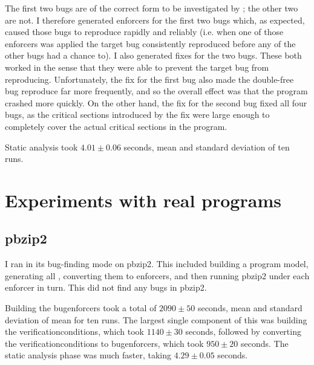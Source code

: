 
The first two bugs are of the correct form to be investigated by
{\technique}; the other two are not.  I therefore generated enforcers
for the first two bugs which, as expected, caused those bugs to
reproduce rapidly and reliably (i.e. when one of those enforcers was
applied the target bug consistently reproduced before any of the other
bugs had a chance to).  I also generated fixes for the two bugs.
These both worked in the sense that they were able to prevent the
target bug from reproducing.  Unfortunately, the fix for the first bug
also made the double-free bug reproduce far more frequently, and so
the overall effect was that the program crashed more quickly.  On the
other hand, the fix for the second bug fixed all four bugs, as the
critical sections introduced by the fix were large enough to
completely cover the actual critical sections in the program.



Static analysis took $4.01 \pm 0.06$ seconds, mean and standard
deviation of ten runs.

\section{Experiments with real programs}
\label{sect:eval:real}

\subsection{pbzip2}

  I
ran {\implementation} in its bug-finding mode on pbzip2.  This
included building a program model, generating all {\StateMachines},
converting them to enforcers, and then running pbzip2 under each
enforcer in turn.  This did not find any bugs in pbzip2.

Building the \glspl{bugenforcer} took a total of $2090 \pm 50$
seconds, mean and standard deviation of mean for ten runs.  The
largest single component of this was building the
\glspl{verificationcondition}, which took $1140 \pm 30$ seconds,
followed by converting the \glspl{verificationcondition} to
\glspl{bugenforcer}, which took $950 \pm 20$ seconds.  The static
analysis phase was much faster, taking $4.29 \pm 0.05$ seconds.

